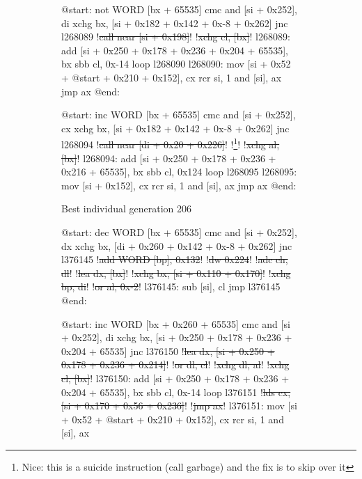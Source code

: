\documentclass[dvipsnames,format=sigconf,anonymous=true,review=true]{acmart}
\begin{document}
\begin{figure}
\centering
\begin{subfigure}[t]{0.32\textwidth}
    \begin{assembly}
    @start:
    not WORD [bx + 65535]
    cmc
    and [si + 0x252], di
    xchg bx, [si + 0x182 + 0x142 + 0x-8 + 0x262]
    jnc l268089
    !\sout{call near [si + 0x198]}!
    !\sout{xchg cl, [bx]}!
    l268089:
    add [si + 0x250 + 0x178 + 0x236 + 0x204 + 65535], bx
    sbb cl, 0x-14
    loop l268090
    l268090:
    mov [si + 0x52 + @start + 0x210 + 0x152], cx
    rcr si, 1
    and [si], ax
    jmp ax
    @end:
    \end{assembly}
    \begin{assembly}
    @start:
    inc WORD [bx + 65535]
    cmc
    and [si + 0x252], cx
    xchg bx, [si + 0x182 + 0x142 + 0x-8 + 0x262]
    jnc l268094
    !\sout{call near [di + 0x20 + 0x226]}!
    !\footnote{Nice: this is a suicide instruction (call garbage) and the fix is to skip over it}!
    !\sout{xchg al, [bx]}!
    l268094:
    add [si + 0x250 + 0x178 + 0x236 + 0x216 + 65535], bx
    sbb cl, 0x124
    loop l268095
    l268095:
    mov [si + 0x152], cx
    rcr si, 1
    and [si], ax
    jmp ax
    @end:
    \end{assembly}
    \caption{Best individual generation 206}
\end{subfigure}
\hfill
\begin{subfigure}[t]{0.32\textwidth}
    \begin{assembly}
    @start:
    dec WORD [bx + 65535]
    cmc
    and [si + 0x252], dx
    xchg bx, [di + 0x260 + 0x142 + 0x-8 + 0x262]
    jnc l376145
    !\sout{add WORD [bp], 0x132}!
    !\sout{dw 0x224}!
    !\sout{adc ch, dl}!
    !\sout{lea dx, [bx]}!
    !\sout{xchg bx, [si + 0x110 + 0x170]}!
    !\sout{xchg bp, di}!
    !\sout{or al, 0x-2}!
    l376145:
    sub [si], cl
    jmp l376145
    @end:
    \end{assembly}
    \begin{assembly}
    @start:
    inc WORD [bx + 0x260 + 65535]
    cmc
    and [si + 0x252], di
    xchg bx, [si + 0x250 + 0x178 + 0x236 + 0x204 + 65535]
    jnc l376150
    !\sout{lea dx, [si + 0x250 + 0x178 + 0x236 + 0x214]}!
    !\sout{or dl, cl}!
    !\sout{xchg dl, al}!
    !\sout{xchg cl, [bx]}!
    l376150:
    add [si + 0x250 + 0x178 + 0x236 + 0x204 + 65535], bx
    sbb cl, 0x-14
    loop l376151
    !\sout{lds cx, [si + 0x170 + 0x56 + 0x236]}!
    !\sout{jmp ax}!
    l376151:
    mov [si + 0x52 + @start + 0x210 + 0x152], cx
    rcr si, 1
    and [si], ax

\end{assembly}
\end{subfigure}
\end{figure}
\end{document}
